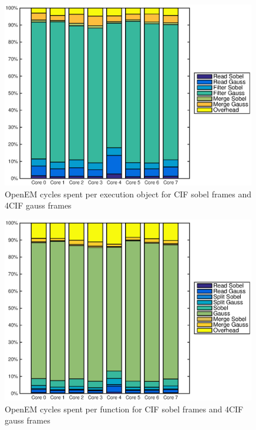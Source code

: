 \begin{figure}[h!]
    \begin{center}
        \includegraphics[width=0.99\textwidth]{images/openem_sobelcif_gauss4cif_eo.eps}
        \caption{OpenEM cycles spent per execution object for CIF sobel frames and 4CIF gauss frames}
        \label{fig:oem8coreeogauss4cif}
    \end{center}
\end{figure}

\begin{figure}[h!]
    \begin{center}
        \includegraphics[width=0.99\textwidth]{images/openem_sobelcif_gauss4cif_func.eps}
        \caption{OpenEM cycles spent per function for CIF sobel frames and 4CIF gauss frames}
        \label{fig:oem8corefuncgauss4cif}
    \end{center}
\end{figure}

